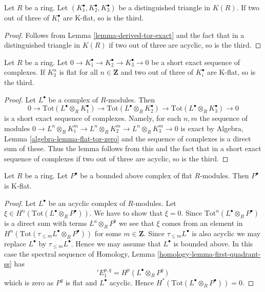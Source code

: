 \begin{lemma}
\label{lemma-K-flat-two-out-of-three}
Let $R$ be a ring. Let $(K_1^\bullet, K_2^\bullet, K_3^\bullet)$ be
a distinguished triangle in $K(R)$. If two out of three
of $K_i^\bullet$ are K-flat, so is the third.
\end{lemma}

\begin{proof}
Follows from
Lemma \ref{lemma-derived-tor-exact}
and the fact that in a distinguished triangle in
$K(R)$ if two out of three are acyclic, so is the third.
\end{proof}

\begin{lemma}
\label{lemma-K-flat-two-out-of-three-ses}
Let $R$ be a ring. Let
$0 \to K_1^\bullet \to K_2^\bullet \to K_3^\bullet \to 0$ be
a short exact sequence of complexes. If $K_3^n$ is flat for
all $n \in \mathbf{Z}$ and two out of three
of $K_i^\bullet$ are K-flat, so is the third.
\end{lemma}

\begin{proof}
Let $L^\bullet$ be a complex of $R$-modules. Then
$$
0 \to
\text{Tot}(L^\bullet \otimes_R K_1^\bullet) \to
\text{Tot}(L^\bullet \otimes_R K_2^\bullet) \to
\text{Tot}(L^\bullet \otimes_R K_3^\bullet) \to 0
$$
is a short exact sequence of complexes. Namely, for each
$n, m$ the sequence of modules
$0 \to L^n \otimes_R K_1^m \to
L^n \otimes_R K_2^m \to
L^n \otimes_R K_3^m \to 0$
is exact by Algebra, Lemma \ref{algebra-lemma-flat-tor-zero}
and the sequence of complexes is a direct sum of these.
Thus the lemma follows from this
and the fact that in a short exact sequence of complexes
if two out of three are acyclic, so is the third.
\end{proof}

\begin{lemma}
\label{lemma-derived-tor-quasi-isomorphism}
Let $R$ be a ring. Let $P^\bullet$ be a bounded above complex of
flat $R$-modules. Then $P^\bullet$ is K-flat.
\end{lemma}

\begin{proof}
Let $L^\bullet$ be an acyclic complex of $R$-modules.
Let $\xi \in H^n(\text{Tot}(L^\bullet \otimes_R P^\bullet))$.
We have to show that $\xi = 0$.
Since $\text{Tot}^n(L^\bullet \otimes_R P^\bullet)$ is a direct
sum with terms $L^a \otimes_R P^b$ we see that $\xi$ comes from
an element in $H^n(\text{Tot}(\tau_{\leq m}L^\bullet \otimes_R P^\bullet))$
for some $m \in \mathbf{Z}$. Since $\tau_{\leq m}L^\bullet$ is also
acyclic we may replace $L^\bullet$ by $\tau_{\leq m}L^\bullet$.
Hence we may assume that $L^\bullet$ is bounded above.
In this case the spectral sequence of
Homology, Lemma \ref{homology-lemma-first-quadrant-ss}
has
$$
{}'E_1^{p, q} = H^p(L^\bullet \otimes_R P^q)
$$
which is zero as $P^q$ is flat and $L^\bullet$ acyclic. Hence
$H^*(\text{Tot}(L^\bullet \otimes_R P^\bullet)) = 0$.
\end{proof}


